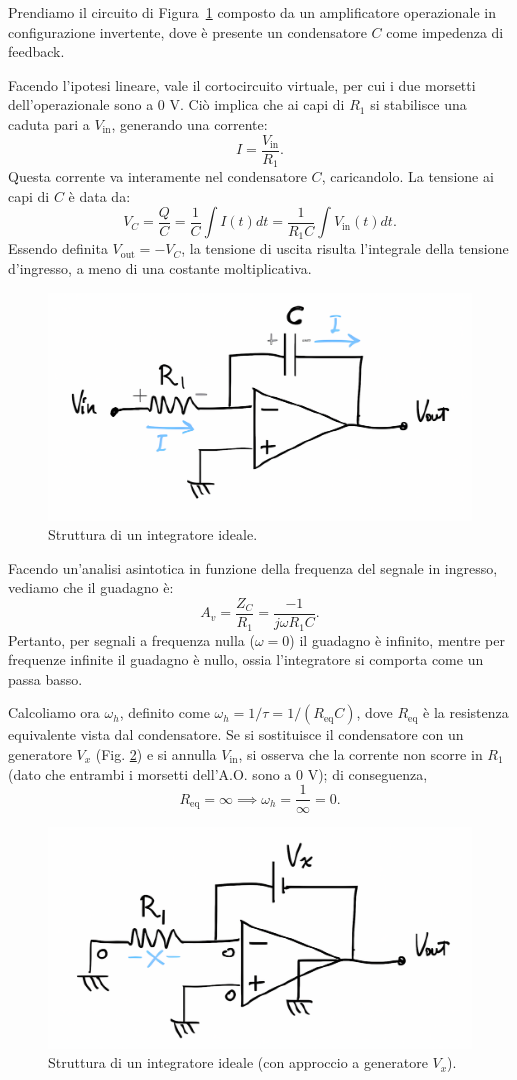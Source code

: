 Prendiamo il circuito di Figura~\ref{fig:integratore_ideale} composto da un amplificatore operazionale in configurazione invertente, dove è presente un condensatore \( C \) come impedenza di feedback.

Facendo l’ipotesi lineare, vale il cortocircuito virtuale, per cui i due morsetti dell’operazionale sono a 0 V. Ciò implica che ai capi di \( R_1 \) si stabilisce una caduta pari a \( V_{\text{in}} \), generando una corrente:
\[
I = \frac{V_{\text{in}}}{R_1}.
\]
Questa corrente va interamente nel condensatore \( C \), caricandolo. La tensione ai capi di \( C \) è data da:
\[
V_C = \frac{Q}{C} = \frac{1}{C} \int I(t) dt = \frac{1}{R_1 C} \int V_{\text{in}}(t) dt.
\]
Essendo definita \( V_{\text{out}} = -V_C \), la tensione di uscita risulta l’integrale della tensione d’ingresso, a meno di una costante moltiplicativa.

\begin{figure}[H]
    \centering
    \includegraphics[width=0.5\linewidth]{images/1.3.1.1.png}
    \caption{Struttura di un integratore ideale.}
    \label{fig:integratore_ideale}
\end{figure}

Facendo un’analisi asintotica in funzione della frequenza del segnale in ingresso, vediamo che il guadagno è:
\[
A_v = \frac{Z_C}{R_1} = \frac{-1}{j \omega R_1 C}.
\]
Pertanto, per segnali a frequenza nulla (\( \omega = 0 \)) il guadagno è infinito, mentre per frequenze infinite il guadagno è nullo, ossia l’integratore si comporta come un passa basso.

Calcoliamo ora \( \omega_h \), definito come \( \omega_h = 1 / \tau = 1 / (R_{\text{eq}} C) \), dove \( R_{\text{eq}} \) è la resistenza equivalente vista dal condensatore. Se si sostituisce il condensatore con un generatore \( V_x \) (Fig. \ref{fig:integratore_g_ten}) e si annulla \( V_{\text{in}} \), si osserva che la corrente non scorre in \( R_1 \) (dato che entrambi i morsetti dell’A.O. sono a 0 V); di conseguenza, 
\[
R_{\text{eq}} = \infty \implies \omega_h = \frac{1}{\infty} = 0.
\]

\begin{figure}[H]
    \centering
    \includegraphics[width=0.5\linewidth]{images/1.3.1.2.png}
    \caption{Struttura di un integratore ideale (con approccio a generatore \(V_x\)).}
    \label{fig:integratore_g_ten}
\end{figure}

